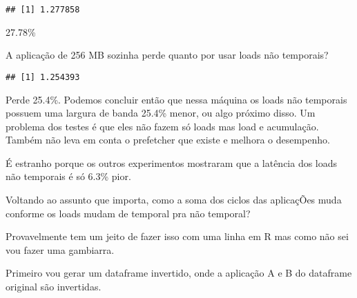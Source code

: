 \documentclass[
]{article}
\newenvironment{Shaded}{\begin{snugshade}}{\end{snugshade}}
\newcommand{\DecValTok}[1]{\textcolor[rgb]{0.00,0.00,0.81}{#1}}
\newcommand{\KeywordTok}[1]{\textcolor[rgb]{0.13,0.29,0.53}{\textbf{#1}}}
\newcommand{\NormalTok}[1]{#1}
\newcommand{\OperatorTok}[1]{\textcolor[rgb]{0.81,0.36,0.00}{\textbf{#1}}}
\newcommand{\StringTok}[1]{\textcolor[rgb]{0.31,0.60,0.02}{#1}}
\begin{document}
\begin{verbatim}
## [1] 1.277858
\end{verbatim}

27.78\%

A aplicação de 256 MB sozinha perde quanto por usar loads não temporais?

\begin{Shaded}
\end{Shaded}

\begin{verbatim}
## [1] 1.254393
\end{verbatim}

Perde 25.4\%. Podemos concluir então que nessa máquina os loads não
temporais possuem uma largura de banda 25.4\% menor, ou algo próximo
disso. Um problema dos testes é que eles não fazem só loads mas load e
acumulação. Também não leva em conta o prefetcher que existe e melhora o
desempenho.

É estranho porque os outros experimentos mostraram que a latência dos
loads não temporais é só 6.3\% pior.

Voltando ao assunto que importa, como a soma dos ciclos das aplicaçÕes
muda conforme os loads mudam de temporal pra não temporal?

Provavelmente tem um jeito de fazer isso com uma linha em R mas como não
sei vou fazer uma gambiarra.

Primeiro vou gerar um dataframe invertido, onde a aplicação A e B do
dataframe original são invertidas.
\end{document}
